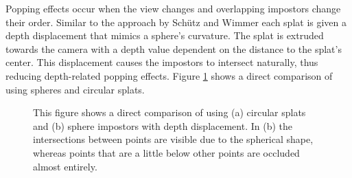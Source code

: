 \par

Popping effects occur when the view changes and overlapping impostors change their order. Similar to the approach by Schütz and Wimmer \cite{SCHUETZ-2015-HQP} each splat is given a depth displacement that mimics a sphere's curvature. The splat is extruded towards the camera with a depth value dependent on the distance to the splat's center. This displacement causes the impostors to intersect naturally, thus reducing depth-related popping effects. Figure \ref{fig:point_sprites} shows a direct comparison of using spheres and circular splats. 


\begin{figure}
\centering
{}
  
\caption[Comparison of (a) circular splats and (b) sphere impostors]
{This figure shows a direct comparison of using (a) circular splats and (b) sphere impostors with depth displacement. In (b) the intersections between points are visible due to the spherical shape, whereas points that are a little below other points are occluded almost entirely.}
\label{fig:point_sprites}
\end{figure}